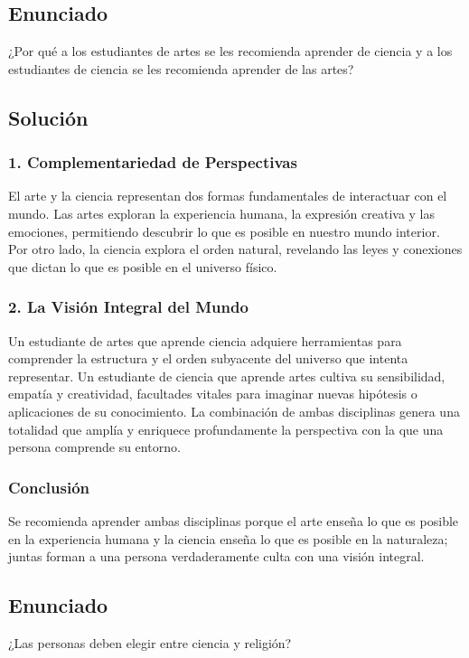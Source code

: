 \documentclass[12pt, a4paper]{article}
\begin{document}
\newpage

\subsection*{Enunciado}
¿Por qué a los estudiantes de artes se les recomienda aprender de ciencia y a los estudiantes de ciencia se les recomienda aprender de las artes?

\subsection*{Solución}

\subsubsection*{1. Complementariedad de Perspectivas}
El arte y la ciencia representan dos formas fundamentales de interactuar con el mundo. Las artes exploran la experiencia humana, la expresión creativa y las emociones, permitiendo descubrir lo que es posible en nuestro mundo interior. Por otro lado, la ciencia explora el orden natural, revelando las leyes y conexiones que dictan lo que es posible en el universo físico.

\subsubsection*{2. La Visión Integral del Mundo}
Un estudiante de artes que aprende ciencia adquiere herramientas para comprender la estructura y el orden subyacente del universo que intenta representar. Un estudiante de ciencia que aprende artes cultiva su sensibilidad, empatía y creatividad, facultades vitales para imaginar nuevas hipótesis o aplicaciones de su conocimiento. La combinación de ambas disciplinas genera una totalidad que amplía y enriquece profundamente la perspectiva con la que una persona comprende su entorno.

\subsubsection*{Conclusión}
Se recomienda aprender ambas disciplinas porque el arte enseña lo que es posible en la experiencia humana y la ciencia enseña lo que es posible en la naturaleza; juntas forman a una persona verdaderamente culta con una visión integral.

\newpage

\subsection*{Enunciado}
¿Las personas deben elegir entre ciencia y religión?
\end{document}
